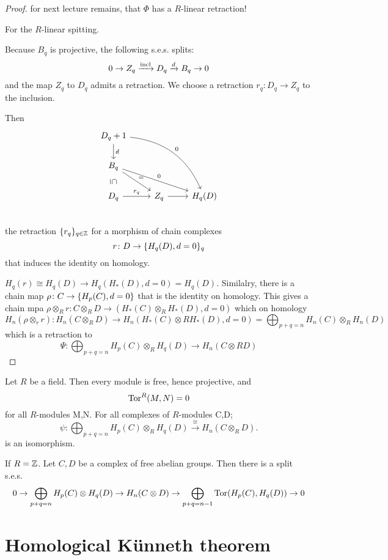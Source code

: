 \documentclass[language=english]{TemplateLecture}
\begin{document}
\begin{proof}
    for next lecture remains, that \(\Phi\) has a \(R\)-linear retraction!


    For the \(R\)-linear spitting.

    Because \(B_q\) is projective, the following s.e.s. splits:
    \[0 \to Z_q \xrightarrow{\operatorname{incl}} D_q \xrightarrow{d}  B_q \to 0\]
    and the map \(Z_q\) to \(D_q\) admits a retraction. We choose a retraction \(r_q\colon D_q \to Z_q\) to the inclusion.

    Then
    \[\begin{tikzcd}
        D_q+1 \ar[d, "d"] \ar[rrdd, bend left, "0"] & & \\
        B_q  \ar[d, phantom, sloped, "\subseteq "] \ar[rrd, "0"] \ar[dr, "="] & & \\
        D_q \ar[r, "r_q"] & Z_q  \ar[r] & H_q(D) \\
    \end{tikzcd}\]
    the retraction \(\{r_q\}_{q \in \mathbb{Z}}\) for a morphism of chain complexes
    \[r\colon D \to \{H_q(D), d = 0\}_q\]
    that induces the identity on homology.

    \(H_q(r) \cong H_q(D) \to H_q(H_*(D), d= 0) = H_q(D)\).
    Similalry, there is a chain map \(\rho\colon C \to \{H_p(C), d = 0\}\) that is the identity on homology. This gives a chain mpa \(\rho \otimes_R r\colon C \otimes_R D \to (H_*(C) \otimes_R H_*(D), d= 0)\) which on homology
    \[H_n(\rho\otimes_r r) \colon H_n(C \otimes_R D) \to H_n(H_*(C) \otimes RH_*(D), d= 0) = \bigoplus_{p+q = n} H_n(C) \otimes_R H_n(D)\]
    which is a retraction to
    \[\Psi \colon \bigoplus_{p+q = n} H_p(C) \otimes_R H_q(D) \to H_n(C\otimes R D)\]

\end{proof}

\begin{example}
    Let \(R\) be a field. Then every module is free, hence projective, and
    \[\mathrm{Tor}^R(M,N) = 0\]
    for all \(R\)-modules M,N. For all complexes of \(R\)-modules C,D;
    \[\psi\colon \bigoplus_{p+q = n} H_p(C) \otimes_R H_q(D) \xrightarrow{\cong} H_n(C\otimes_R D).\]
    is an isomorphism.

    If \(R = \mathbb{Z}\). Let \(C,D\) be a complex of free abelian groups. Then there is a split s.e.s.
    \[0 \to \bigoplus_{p+q = n} H_p(C) \otimes H_q(D) \to H_n(C\otimes D) \to \bigoplus_{p+q = n-1} \mathrm{Tor}(H_p(C), H_q(D)) \to 0\]
\end{example}

\section{Homological Künneth theorem}
\end{document}
